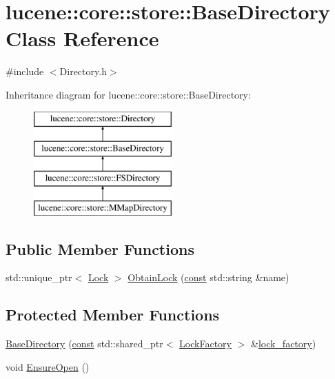 \hypertarget{classlucene_1_1core_1_1store_1_1BaseDirectory}{}\section{lucene\+:\+:core\+:\+:store\+:\+:Base\+Directory Class Reference}
\label{classlucene_1_1core_1_1store_1_1BaseDirectory}


{\ttfamily \#include $<$Directory.\+h$>$}

Inheritance diagram for lucene\+:\+:core\+:\+:store\+:\+:Base\+Directory\+:\begin{figure}[H]
\begin{center}
\leavevmode
\includegraphics[height=4.000000cm]{classlucene_1_1core_1_1store_1_1BaseDirectory}
\end{center}
\end{figure}
\subsection*{Public Member Functions}
\begin{DoxyCompactItemize}
\item 
std\+::unique\+\_\+ptr$<$ \mbox{\hyperlink{classlucene_1_1core_1_1store_1_1Lock}{Lock}} $>$ \mbox{\hyperlink{classlucene_1_1core_1_1store_1_1BaseDirectory_a42ea39f7b8b99972e6e39710e0563037}{Obtain\+Lock}} (\mbox{\hyperlink{ZlibCrc32_8h_a2c212835823e3c54a8ab6d95c652660e}{const}} std\+::string \&name)
\end{DoxyCompactItemize}
\subsection*{Protected Member Functions}
\begin{DoxyCompactItemize}
\item 
\mbox{\hyperlink{classlucene_1_1core_1_1store_1_1BaseDirectory_a94a76ba3222363ddb6f2457e88c9fa28}{Base\+Directory}} (\mbox{\hyperlink{ZlibCrc32_8h_a2c212835823e3c54a8ab6d95c652660e}{const}} std\+::shared\+\_\+ptr$<$ \mbox{\hyperlink{classlucene_1_1core_1_1store_1_1LockFactory}{Lock\+Factory}} $>$ \&\mbox{\hyperlink{classlucene_1_1core_1_1store_1_1BaseDirectory_a61e759bb8ca8ec591d2a067679164f3a}{lock\+\_\+factory}})
\item 
void \mbox{\hyperlink{classlucene_1_1core_1_1store_1_1BaseDirectory_ae98262cc7ef9b3285ffe789eaa72e82a}{Ensure\+Open}} ()
\end{DoxyCompactItemize}
